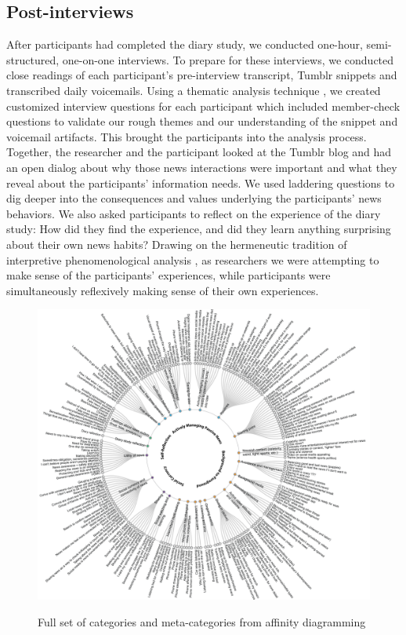 \documentclass[sigchi]{acmart}
\begin{document}
\subsection{Post-interviews}
After participants had completed the diary study, we conducted one-hour, semi-structured, one-on-one interviews. To prepare for these interviews, we conducted close readings of each participant’s pre-interview transcript, Tumblr snippets and transcribed daily voicemails. Using a thematic analysis technique \cite{braun2006using}, we created customized interview questions for each participant which included member-check questions \cite{lincoln1985naturalistic} to validate our rough themes and our understanding of the snippet and voicemail artifacts. This brought the participants into the analysis process. Together, the researcher and the participant looked at the Tumblr blog and had an open dialog about why those news interactions were important and what they reveal about the participants’ information needs. We used laddering questions \cite{subramony2002users} to dig deeper into the consequences and values underlying the participants’ news behaviors. We also asked participants to reflect on the experience of the diary study: How did they find the experience, and did they learn anything surprising about their own news habits? Drawing on the hermeneutic tradition of interpretive phenomenological analysis \cite{smith_flowers_larkin_2013}, as researchers we were attempting to make sense of the participants’ experiences, while participants were simultaneously reflexively making sense of their own experiences.

\begin{figure}
  \caption{Full set of categories and meta-categories from affinity diagramming}
  \includegraphics[width=\textwidth]{figures/circular-dengrogram.png}
  \label{fig:category-labels}
\end{figure}
\end{document}
